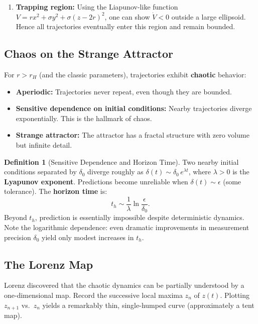 \documentclass[11pt,letterpaper]{article}
\theoremstyle{definition}
\newtheorem{definition}{Definition}[section]
\theoremstyle{plain}
\theoremstyle{remark}
\begin{document}
\begin{enumerate}[leftmargin=2em]
\item \textbf{Trapping region:}  Using the Liapunov-like function
      $V = rx^2 + \sigma y^2 + \sigma(z-2r)^2$, one can show $\dot{V}<0$
      outside a large ellipsoid.  Hence all trajectories eventually enter
      this region and remain bounded.
\end{enumerate}

\subsection{Chaos on the Strange Attractor}

For $r > r_H$ (and the classic parameters), trajectories exhibit
\textbf{chaotic} behavior:
\begin{itemize}[leftmargin=2em]
\item \textbf{Aperiodic:} Trajectories never repeat, even though they are
      bounded.
\item \textbf{Sensitive dependence on initial conditions:}  Nearby
      trajectories diverge exponentially.  This is the hallmark of chaos.
\item \textbf{Strange attractor:}  The attractor has a fractal structure
      with zero volume but infinite detail.
\end{itemize}

\begin{definition}[Sensitive Dependence and Horizon Time]
Two nearby initial conditions separated by $\delta_0$ diverge roughly as
$\delta(t) \sim \delta_0\, e^{\lambda t}$, where $\lambda > 0$ is the
\textbf{Lyapunov exponent}.  Predictions become unreliable when
$\delta(t) \sim \epsilon$ (some tolerance).  The \textbf{horizon time} is:
\begin{equation}\label{eq:horizon}
  t_h \sim \frac{1}{\lambda}\ln\frac{\epsilon}{\delta_0}.
\end{equation}
Beyond $t_h$, prediction is essentially impossible despite deterministic
dynamics.  Note the logarithmic dependence: even dramatic improvements in
measurement precision $\delta_0$ yield only modest increases in $t_h$.
\end{definition}

\subsection{The Lorenz Map}

Lorenz discovered that the chaotic dynamics can be partially understood by
a one-dimensional map.  Record the successive local maxima $z_n$ of $z(t)$.
Plotting $z_{n+1}$ vs.\ $z_n$ yields a remarkably thin, single-humped curve
(approximately a tent map).
\end{document}
